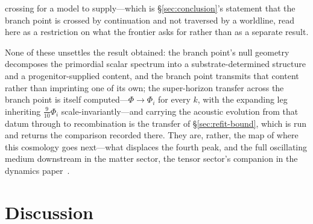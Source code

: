 \documentclass[11pt,a4paper]{article}
\theoremstyle{plain}
\theoremstyle{definition}
\theoremstyle{remark}
\begin{document}
crossing for a model to supply---which is \S\ref{sec:conclusion}'s statement that the branch point is crossed by continuation and not traversed by a worldline, read here as a restriction on what the frontier asks for rather than as a separate result.

None of these unsettles the result obtained: the branch point's null geometry decomposes the primordial scalar spectrum into a substrate-determined structure and a progenitor-supplied content, and the branch point transmits that content rather than imprinting one of its own; the super-horizon transfer across the branch point is itself
computed---$\Phi\to\Phi_i$ for every $k$, with the expanding leg inheriting
$\tfrac{9}{10}\Phi_i$ scale-invariantly---and carrying the acoustic evolution from that
datum through to recombination is the transfer of \S\ref{sec:refit-bound}, which is run and returns the comparison recorded there. They are, rather, the map of where this cosmology goes next---what displaces the fourth peak, and the full oscillating medium downstream in the matter sector, the tensor sector's companion in the dynamics paper~\cite{JanzenDynamics}.

\section{Discussion}\label{sec:discussion}
\end{document}
